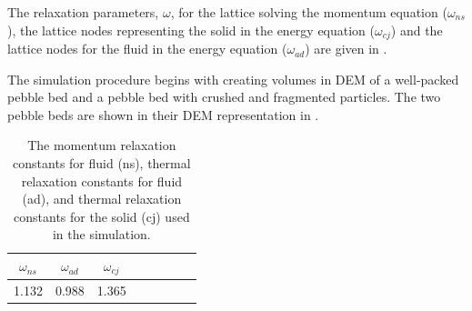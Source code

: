 The relaxation parameters, $\omega$, for the lattice solving the momentum equation ($\omega_{ns}$), the lattice nodes representing the solid in the energy equation ($\omega_{cj}$) and the lattice nodes for the fluid in the energy equation ($\omega_{ad}$) are given in .

The simulation procedure begins with creating volumes in DEM of a well-packed pebble bed and a pebble bed with crushed and fragmented particles. The two pebble beds are shown in their DEM representation in .


\begin {table}[ht] %
\caption{The momentum relaxation constants for fluid (ns), thermal relaxation constants for fluid (ad), and thermal relaxation constants for the solid (cj) used in the simulation.}
\label{tab:lbm-relaxations} \centering %
\begin {tabular}{ cccccccc }
\toprule %
$\omega_{ns}$ &  $\omega_{ad}$  &   $\omega_{cj}$     \\\toprule
1.132      &  0.988       &   1.365          \\\bottomrule
\end{tabular}
\end{table}



